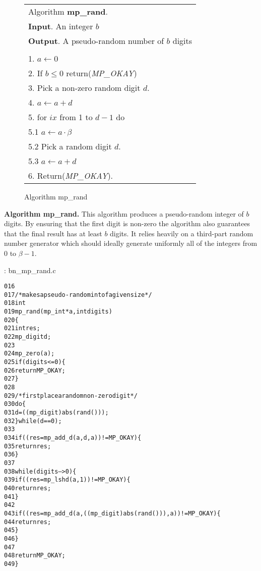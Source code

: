 \documentclass[b5paper]{book}
\begin{document}
\newpage\begin{figure}[!here]
\begin{small}
\begin{center}
\begin{tabular}{l}
\hline Algorithm \textbf{mp\_rand}. \\
\textbf{Input}.   An integer $b$ \\
\textbf{Output}.  A pseudo-random number of $b$ digits \\
\hline \\
1.  $a \leftarrow 0$ \\
2.  If $b \le 0$ return(\textit{MP\_OKAY}) \\
3.  Pick a non-zero random digit $d$. \\
4.  $a \leftarrow a + d$ \\
5.  for $ix$ from 1 to $d - 1$ do \\
\hspace{3mm}5.1  $a \leftarrow a \cdot \beta$ \\
\hspace{3mm}5.2  Pick a random digit $d$. \\
\hspace{3mm}5.3  $a \leftarrow a + d$ \\
6.  Return(\textit{MP\_OKAY}). \\
\hline
\end{tabular}
\end{center}
\end{small}
\caption{Algorithm mp\_rand}
\end{figure}
\textbf{Algorithm mp\_rand.}
This algorithm produces a pseudo-random integer of $b$ digits.  By ensuring that the first digit is non-zero the algorithm also guarantees that the
final result has at least $b$ digits.  It relies heavily on a third-part random number generator which should ideally generate uniformly all of
the integers from $0$ to $\beta - 1$.  

\vspace{+3mm}\begin{small}
\hspace{-5.1mm}{\bf File}: bn\_mp\_rand.c
\vspace{-3mm}
\begin{alltt}
016   
017   /* makes a pseudo-random int of a given size */
018   int
019   mp_rand (mp_int * a, int digits)
020   \{
021     int     res;
022     mp_digit d;
023   
024     mp_zero (a);
025     if (digits <= 0) \{
026       return MP_OKAY;
027     \}
028   
029     /* first place a random non-zero digit */
030     do \{
031       d = ((mp_digit) abs (rand ()));
032     \} while (d == 0);
033   
034     if ((res = mp_add_d (a, d, a)) != MP_OKAY) \{
035       return res;
036     \}
037   
038     while (digits-- > 0) \{
039       if ((res = mp_lshd (a, 1)) != MP_OKAY) \{
040         return res;
041       \}
042   
043       if ((res = mp_add_d (a, ((mp_digit) abs (rand ())), a)) != MP_OKAY) \{
044         return res;
045       \}
046     \}
047   
048     return MP_OKAY;
049   \}
\end{alltt}
\end{small}
\end{document}
